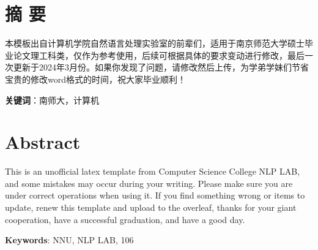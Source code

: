 \documentclass[12pt, a4paper]{article}
\title{}
\date{}
\begin{document}






{\centering\section*{摘 \quad 要}}
\pagestyle{fancy}
\fancyhf{}
\fancyfoot[CO, CE]{\thepage} %
本模板出自计算机学院自然语言处理实验室的前辈们，适用于南京师范大学硕士毕业论文理工科类，仅作为参考使用，后续可根据具体的要求变动进行修改，最后一次更新于2024年3月份。如果你发现了问题，请修改然后上传，为学弟学妹们节省宝贵的修改word格式的时间，祝大家毕业顺利！


\par\noindent\textbf{关键词}：南师大，计算机

\newpage %
{\centering\section*{Abstract}} 


This is an unofficial latex template from Computer Science College NLP LAB, and some mistakes may occur during your writing. Please make sure you are under correct operations when using it. If you find something wrong or items to update, renew this template and upload to the overleaf, thanks for your giant cooperation, have a successful graduation, and have a good day. 

\par\noindent\textbf{Keywords}: NNU, NLP LAB, 106


\restoregeometry
\newpage

\pagestyle{fancy}
\fancyhf{}
\fancyhead[CO, CE]{\leftmark}
\fancyfoot[CO, CE]{\thepage}

\newpage

\tableofcontents  
{}
\newpage
\end{document}
